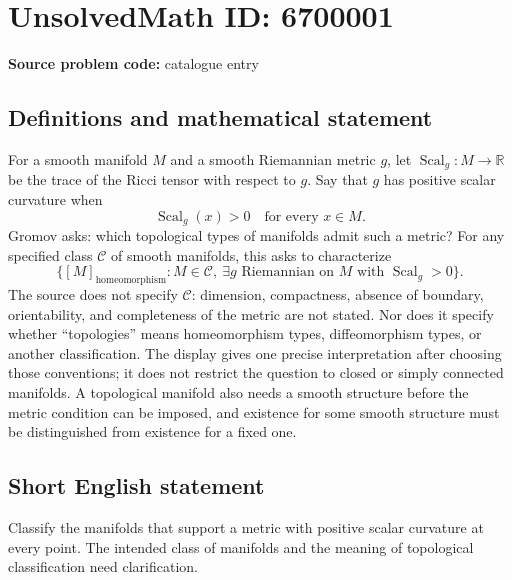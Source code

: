 \documentclass[11pt]{article}
\newcommand{\R}{\mathbb{R}}
\begin{document}
\section*{UnsolvedMath ID: 6700001}
\textbf{Source problem code:} catalogue entry
\subsection{Definitions and mathematical statement}
For a smooth manifold \(M\) and a smooth Riemannian metric \(g\), let \(\operatorname{Scal}_g:M\to\R\) be the trace of the Ricci tensor with respect to \(g\). Say that \(g\) has positive scalar curvature when
\[
\operatorname{Scal}_g(x)>0\quad\text{for every }x\in M.
\]
Gromov asks: which topological types of manifolds admit such a metric? For any specified class \(\mathcal C\) of smooth manifolds, this asks to characterize
\[
\{[M]_{\mathrm{homeomorphism}}: M\in\mathcal C,\ \exists g\text{ Riemannian on }M\text{ with }\operatorname{Scal}_g>0\}.
\]
The source does not specify \(\mathcal C\): dimension, compactness, absence of boundary, orientability, and completeness of the metric are not stated. Nor does it specify whether ``topologies'' means homeomorphism types, diffeomorphism types, or another classification. The display gives one precise interpretation after choosing those conventions; it does not restrict the question to closed or simply connected manifolds. A topological manifold also needs a smooth structure before the metric condition can be imposed, and existence for some smooth structure must be distinguished from existence for a fixed one.
\subsection{Short English statement}
Classify the manifolds that support a metric with positive scalar curvature at every point. The intended class of manifolds and the meaning of topological classification need clarification.
\end{document}
